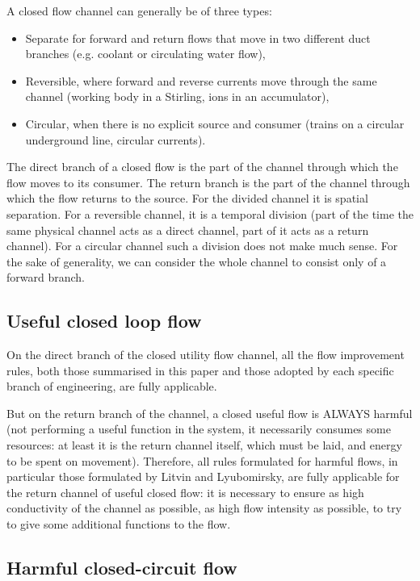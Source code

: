 \documentclass[a4paper,11pt]{article}
\begin{document}
A closed flow channel can generally be of three types:
\begin{itemize}
\item Separate for forward and return flows that move in two different duct
  branches (e.g. coolant or circulating water flow),
\item Reversible, where forward and reverse currents move through the same
  channel (working body in a Stirling, ions in an accumulator),
\item Circular, when there is no explicit source and consumer (trains on a
  circular underground line, circular currents).
\end{itemize}
The direct branch of a closed flow is the part of the channel through which
the flow moves to its consumer. The return branch is the part of the channel
through which the flow returns to the source. For the divided channel it is
spatial separation. For a reversible channel, it is a temporal division (part
of the time the same physical channel acts as a direct channel, part of it
acts as a return channel). For a circular channel such a division does not
make much sense. For the sake of generality, we can consider the whole channel
to consist only of a forward branch.

\subsection{Useful closed loop flow}

On the direct branch of the closed utility flow channel, all the flow
improvement rules, both those summarised in this paper and those adopted by
each specific branch of engineering, are fully applicable.

But on the return branch of the channel, a closed useful flow is ALWAYS
harmful (not performing a useful function in the system, it necessarily
consumes some resources: at least it is the return channel itself, which must
be laid, and energy to be spent on movement). Therefore, all rules formulated
for harmful flows, in particular those formulated by Litvin and Lyubomirsky,
are fully applicable for the return channel of useful closed flow: it is
necessary to ensure as high conductivity of the channel as possible, as high
flow intensity as possible, to try to give some additional functions to the
flow.

\subsection{Harmful closed-circuit flow}
\end{document}

